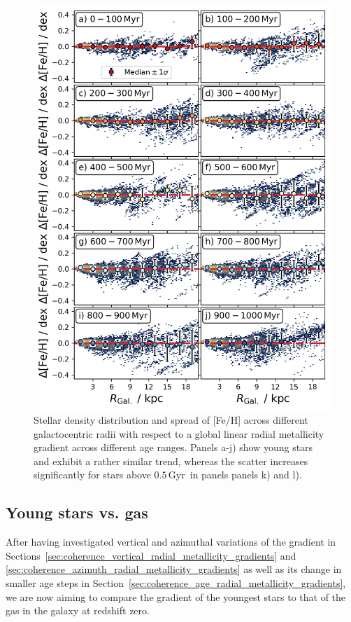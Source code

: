 \documentclass[fleqn,usenatbib]{mnras}
\newcommand{\nihaoAGEmax}{$0.5\,\mathrm{Gyr}$}
\begin{document}
\begin{figure}
    \centering
    \includegraphics[width=\columnwidth]{figures/scatter_with_increasing_age.png}
    \caption{Stellar density distribution and spread of [Fe/H] across different galactocentric radii with respect to a global linear radial metallicity gradient across different age ranges. Panels a-j) show young stars and exhibit a rather similar trend, whereas the scatter increases significantly for stars above \nihaoAGEmax\ in panels panels k) and l).}
    \label{fig:scatter_with_increasing_age}
\end{figure}

\subsection{Young stars vs. gas}
\label{sec:young_stars_vs_gas}

After having investigated vertical and azimuthal variations of the gradient in Sections~\ref{sec:coherence_vertical_radial_metallicity_gradients} and \ref{sec:coherence_azimuth_radial_metallicity_gradients} as well as its change in smaller age steps in Section~\ref{sec:coherence_age_radial_metallicity_gradients}, we are now aiming to compare the gradient of the youngest stars to that of the gas in the galaxy at redshift zero.
\end{document}
